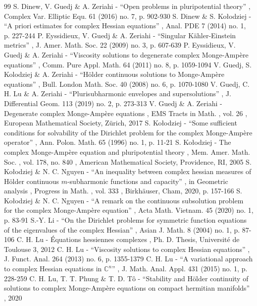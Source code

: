 \documentclass[11pt]{article}
\numberwithin{equation}{section}
\theoremstyle{definition}
\theoremstyle{plain}
\theoremstyle{definition}
\begin{document}
\begin{thebibliography}{99}
 S. Dinew, V. Guedj \& A. Zeriahi - “Open problems in pluripotential theory” , Complex Var. Elliptic Equ. 61 (2016) no. 7, p. 902-930
 S. Dinew \& S. Kołodziej - “A priori estimates for complex Hessian equations” , Anal. PDE 7 (2014) no. 1, p. 227-244
 P. Eyssidieux, V. Guedj \& A. Zeriahi - “Singular Kähler-Einstein metrics” , J. Amer. Math. Soc. 22 (2009) no. 3, p. 607-639
 P. Eyssidieux, V. Guedj \& A. Zeriahi - “Viscosity solutions to degenerate complex Monge-Ampère equations” , Comm. Pure Appl. Math. 64 (2011) no. 8, p. 1059-1094
 V. Guedj, S. Kolodziej \& A. Zeriahi - “Hölder continuous solutions to Monge-Ampère equations” , Bull. London Math. Soc. 40 (2008) no. 6, p. 1070-1080
 V. Guedj, C. H. Lu \& A. Zeriahi - “Plurisubharmonic envelopes and supersolutions” , J. Differential Geom. 113 (2019) no. 2, p. 273-313
 V. Guedj \& A. Zeriahi - Degenerate complex Monge-Ampère equations , EMS Tracts in Math. , vol. 26 , European Mathematical Society, Zürich, 2017
 S. Kołodziej - “Some sufficient conditions for solvability of the Dirichlet problem for the complex Monge-Ampère operator” , Ann. Polon. Math. 65 (1996) no. 1, p. 11-21
 S. Kołodziej - The complex Monge-Ampère equation and pluripotential theory , Mem. Amer. Math. Soc. , vol. 178, no. 840 , American Mathematical Society, Providence, RI, 2005
 S. Kołodziej \& N. C. Nguyen - “An inequality between complex hessian measures of Hölder continuous $m$-subharmonic functions and capacity” , in Geometric analysis , Progress in Math. , vol. 333 , Birkhäuser, Cham, 2020, p. 157-166
 S. Kołodziej \& N. C. Nguyen - “A remark on the continuous subsolution problem for the complex Monge-Ampère equation” , Acta Math. Vietnam. 45 (2020) no. 1, p. 83-91
 S.-Y. Li - “On the Dirichlet problems for symmetric function equations of the eigenvalues of the complex Hessian” , Asian J. Math. 8 (2004) no. 1, p. 87-106
 C. H. Lu - Équations hessiennes complexes , Ph. D. Thesis, Université de Toulouse 3, 2012
 C. H. Lu - “Viscosity solutions to complex Hessian equations” , J. Funct. Anal. 264 (2013) no. 6, p. 1355-1379
 C. H. Lu - “A variational approach to complex Hessian equations in $\mathbb{C}^n$” , J. Math. Anal. Appl. 431 (2015) no. 1, p. 228-259
 C. H. Lu, T. T. Phung \& T. D. Tô - “Stability and Hölder continuity of solutions to complex Monge-Ampère equations on compact hermitian manifolds” , 2020

\end{thebibliography}
\end{document}
